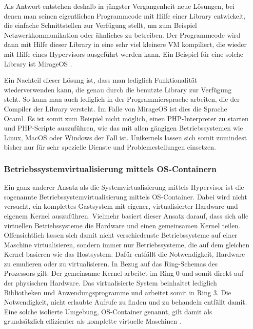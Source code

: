 Als Antwort entstehen deshalb in jüngster Vergangenheit neue Lösungen, bei denen man seinen eigentlichen Programmcode mit Hilfe einer Library entwickelt, die einfache Schnittstellen zur Verfügung stellt, um zum Beispiel Netzwerkkommunikation oder ähnliches zu betreiben. Der Programmcode wird dann mit Hilfe dieser Library in eine sehr viel kleinere \ac{VM} kompiliert, die wieder mit Hilfe eines Hypervisors ausgeführt werden kann. Ein Beispiel für eine solche Library ist MirageOS \citep[Vgl.][]{MadMorAnd13}.

Ein Nachteil dieser Lösung ist, dass man lediglich Funktionalität wiederverwenden kann, die genau durch die benutzte Library zur Verfügung steht. So kann man auch lediglich in der Programmiersprache arbeiten, die der Compiler der Library versteht. Im Falle von MirageOS ist dies die Sprache Ocaml. Es ist somit zum Beispiel nicht möglich, einen PHP-Interpreter zu starten und PHP-Scripte auszuführen, wie das mit allen gängigen Betriebssystemen wie Linux, MacOS oder Windows der Fall ist. Unikernels lassen sich somit zumindest bisher nur für sehr spezielle Dienste und Problemestellungen einsetzen.

\subsubsection{Betriebssystemvirtualisierung mittels OS-Containern}

Ein ganz anderer Ansatz als die Systemvirtualisierung mittels Hypervisor ist die sogenannte Betriebssystemvirtualisierung mittels OS-Container. Dabei wird nicht versucht, ein komplettes Gastsystem mit eigener, virtualisierter Hardware und eigenem Kernel auszuführen. Vielmehr basiert dieser Ansatz darauf, dass sich alle virtuellen Betriebssysteme die Hardware und einen gemeinsamen Kernel teilen. Offensichtlich lassen sich damit nicht verschiedenste Betriebssysteme auf einer Maschine virtualisieren, sondern immer nur Betriebssysteme, die auf dem gleichen Kernel basieren wie das Hostsystem. Dafür entfällt die Notwendigkeit, Hardware zu emulieren oder zu virtualisieren. In Bezug auf das Ring-Schemas des Prozessors gilt: Der gemeinsame Kernel arbeitet im Ring 0 und somit direkt auf der physischen Hardware. Das virtualisierte System beinhaltet lediglich Bibliotheken und Anwendungsprogramme und arbeitet somit in Ring 3. Die Notwendigkeit, nicht erlaubte Aufrufe zu finden und zu behandeln entfällt damit. Eine solche isolierte Umgebung, OS-Container genannt, gilt damit als grundsätzlich effizienter als komplette virtuelle Maschinen \citep[Vgl.][Introduction]{Turnball14}.

